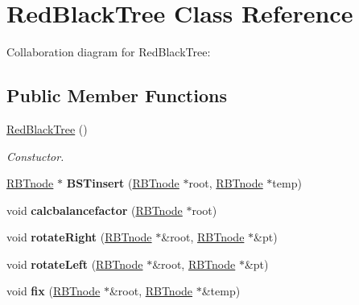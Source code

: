 \hypertarget{classRedBlackTree}{}\section{Red\+Black\+Tree Class Reference}
\label{classRedBlackTree}


Collaboration diagram for Red\+Black\+Tree\+:
\subsection*{Public Member Functions}
\begin{DoxyCompactItemize}
\item 
\mbox{\label{classRedBlackTree_a16706b7c753cf2d86514cda01840abd9}} 
\hyperlink{classRedBlackTree_a16706b7c753cf2d86514cda01840abd9}{Red\+Black\+Tree} ()
\begin{DoxyCompactList}\small\item\em Constuctor. \end{DoxyCompactList}\item 
\mbox{\label{classRedBlackTree_a5769de46e4a3d6a908bf636cd1ab5cbf}} 
\hyperlink{classRBTnode}{R\+B\+Tnode} $\ast$ {\bfseries B\+S\+Tinsert} (\hyperlink{classRBTnode}{R\+B\+Tnode} $\ast$root, \hyperlink{classRBTnode}{R\+B\+Tnode} $\ast$temp)
\item 
\mbox{\label{classRedBlackTree_a91cd12fd6b93fc93872a0adfd63963b1}} 
void {\bfseries calcbalancefactor} (\hyperlink{classRBTnode}{R\+B\+Tnode} $\ast$root)
\item 
\mbox{\label{classRedBlackTree_aeaaf54b808473edf2302fdc79d475cf3}} 
void {\bfseries rotate\+Right} (\hyperlink{classRBTnode}{R\+B\+Tnode} $\ast$\&root, \hyperlink{classRBTnode}{R\+B\+Tnode} $\ast$\&pt)
\item 
\mbox{\label{classRedBlackTree_a92e20c673df2faa6631c4442ae2f2964}} 
void {\bfseries rotate\+Left} (\hyperlink{classRBTnode}{R\+B\+Tnode} $\ast$\&root, \hyperlink{classRBTnode}{R\+B\+Tnode} $\ast$\&pt)
\item 
\mbox{\label{classRedBlackTree_a304bd2950d52ea75de9c8c3834724cf4}} 
void {\bfseries fix} (\hyperlink{classRBTnode}{R\+B\+Tnode} $\ast$\&root, \hyperlink{classRBTnode}{R\+B\+Tnode} $\ast$\&temp)

\end{DoxyCompactItemize}
